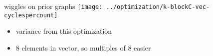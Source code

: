 
\begin{frame}{wiggles on prior graphs}
\texttt{[image: ../optimization/k-blockC-vec-cyclespercount]}
    \begin{itemize}
    \item variance from this optimization
    \item 8 elements in vector, so multiples of 8 easier
    \end{itemize}
\end{frame}

